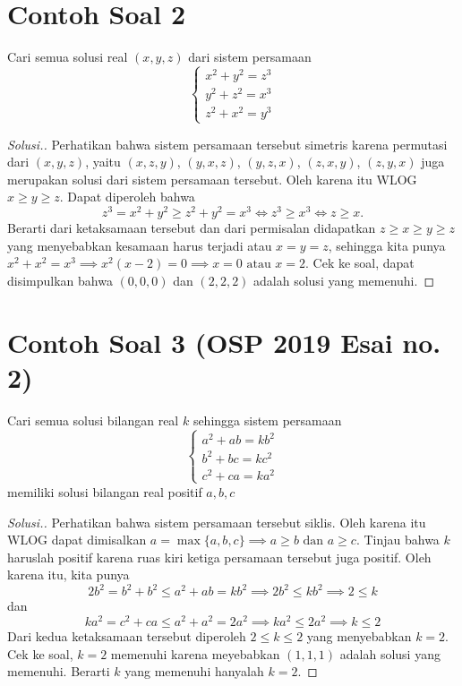 \documentclass[11pt]{scrartcl}
\begin{document}
\section{Contoh Soal 2}
\begin{example*}
Cari semua solusi real $(x,y,z)$ dari sistem persamaan\\[-10pt] 
		$$\begin{cases}
			x^2+y^2 = z^3\\
			y^2+z^2 = x^3\\
			z^2+x^2 = y^3
		\end{cases}$$
\end{example*}
\begin{proof}[Solusi.] Perhatikan bahwa sistem persamaan tersebut simetris karena permutasi dari $(x,y,z)$, yaitu $(x,z,y)$,  $(y,x,z)$, $(y,z,x)$, $(z,x,y)$, $(z,y,x)$ juga merupakan solusi dari sistem persamaan tersebut. Oleh karena itu WLOG $x \ge y \ge z$. Dapat diperoleh bahwa
$$z^3=x^2+y^2 \ge z^2 + y^2 = x^3 \iff z^3 \ge x^3 \iff z \ge x.$$ 
Berarti dari ketaksamaan tersebut dan dari permisalan didapatkan $z \ge x \ge y \ge z$ yang menyebabkan kesamaan harus terjadi atau $x=y=z$, sehingga kita punya $x^2+x^2=x^3 \implies x^2(x-2)=0 \implies x=0 \text{ atau } x=2$. Cek ke soal, dapat disimpulkan bahwa $(0,0,0)$ dan $(2,2,2)$ adalah solusi yang memenuhi.

\end{proof}


\section{Contoh Soal 3 (OSP 2019 Esai no. 2)}
\begin{example*}
\item  Cari semua solusi bilangan real $k$ sehingga sistem persamaan\\[-10pt] 
		$$\begin{cases}
			a^2+ab=kb^2 \\
			b^2+bc=kc^2 \\
			c^2+ca=ka^2
		\end{cases}$$
memiliki solusi bilangan real positif $a,b,c$
\end{example*}
\begin{proof}[Solusi.] Perhatikan bahwa sistem persamaan tersebut siklis. Oleh karena itu WLOG dapat dimisalkan $a = \max \{a,b,c\} \implies a \ge b \text{ dan } a \ge c$. Tinjau bahwa $k$ haruslah positif karena ruas kiri ketiga persamaan tersebut juga positif. Oleh karena itu, kita punya
$$2b^2 = b^2+b^2 \le a^2+ab = kb^2 \implies 2b^2 \le kb^2 \implies 2 \le k$$
dan 
$$ka^2 = c^2 + ca \le a^2 + a^2 = 2a^2 \implies ka^2 \le 2a^2 \implies k \le 2$$
Dari kedua ketaksamaan tersebut diperoleh $2 \le k \le 2$ yang menyebabkan $k=2$.
Cek ke soal, $k=2$ memenuhi karena meyebabkan $(1,1,1)$ adalah solusi yang memenuhi. Berarti $k$ yang memenuhi hanyalah $k=2$.


\end{proof}
\end{document}
